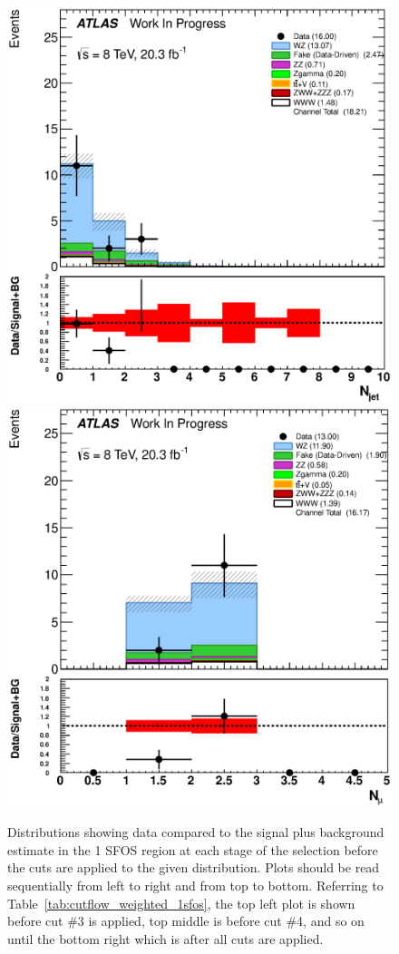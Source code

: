 \begin{figure}[ht!]
\includegraphics[width=0.3\columnwidth]{figures/appendix_signal_selection/Nov24Update_FakeSys_KFacSys_LinearY_Rebin/output/jobs/MxM/DataFull_Rates_May13_FakeRatesExactly2Loose_MuonMxMBJetGt0_ElBJetGt0SubtractPC_MxM/PreselectionNov23_15_1SFOS_ChargeAbs1_BVeto85_ZVetoLow35High25GeV_METGt45GeV_DeltaPhi2p5_physics/weight_all/eps/NJets_histratio.eps}
\includegraphics[width=0.3\columnwidth]{figures/appendix_signal_selection/Nov24Update_FakeSys_KFacSys_LinearY_Rebin/output/jobs/MxM/DataFull_Rates_May13_FakeRatesExactly2Loose_MuonMxMBJetGt0_ElBJetGt0SubtractPC_MxM/PreselectionNov23_15_1SFOS_ChargeAbs1_BVeto85_ZVetoLow35High25GeV_METGt45GeV_DeltaPhi2p5_NJetLt2_physics/weight_all/eps/NMuons_histratio.eps}


\caption{Distributions showing data compared to the signal plus background estimate in the 1 SFOS region at each stage 
of the selection before the cuts are applied to the given distribution. Plots should be read sequentially from left to right
and from top to bottom. 
Referring to Table~\ref{tab:cutflow_weighted_1sfos}, the top left
plot is shown before cut \#3 is applied, top middle is before cut \#4, and
so on until the bottom right which is after all cuts are applied.}
\label{fig:1sfos}
\end{figure}

